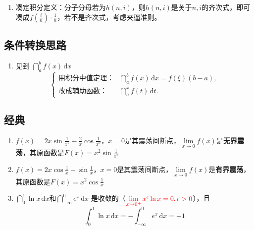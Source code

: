 \documentclass[../book.tex]{subfiles}
\begin{document}
    \begin{enumerate}
        \item 凑定积分定义：分子分母若为$h(n, i)$，则$h(n, i)$是关于$n, i$的齐次式，即可凑成$f(\displaystyle\frac{i}{n})\cdot \displaystyle\frac{1}{n}$，若不是齐次式，考虑夹逼准则。
    \end{enumerate}

    \subsection{条件转换思路}

    \begin{enumerate}
        \item 见到 $\dint_a^b f(x)\,\mathrm{d}x$
        \[
            \begin{cases}
                \text{用积分中值定理：}
                & \dint_a^b f(x)\,\mathrm{d}x = f(\xi)(b-a), \\[6pt]
                \text{改成辅助函数：}
                & \dint_a^x f(t)\,\mathrm{d}t.
            \end{cases}
        \]
    \end{enumerate}

    \subsection{经典}

    \begin{enumerate}
        \item $f(x) = 2x\sin \displaystyle\frac{1}{x^2} - \displaystyle\frac{2}{x}\cos \displaystyle\frac{1}{x^2}$，$x = 0$是其震荡间断点，$\lim\limits_{x\to 0} f(x)$是\textbf{无界震荡}，其原函数是$F(x) = x^2 \sin \displaystyle\frac{1}{x^2}$
        \item $f(x) = 2x\cos \displaystyle\frac{1}{x} + \sin \displaystyle\frac{1}{x}$，$x = 0$是其震荡间断点，$\lim\limits_{x\to 0} f(x)$是\textbf{有界震荡}，其原函数是$F(x) = x^2\cos \displaystyle\frac{1}{x}$
        \item $\dint_0^1 \ln x\,\mathrm{d}x$和$\dint_{-\infty}^0 e^x\,\mathrm{d}x$ 是收敛的（$\color{red}{\lim\limits_{x\to 0^+} x^{\epsilon}\ln x = 0, \epsilon > 0}$），且
        \[
            \int_0^1 \ln x\,\mathrm{d}x = -\int_{-\infty}^0 e^x\,\mathrm{d}x = -1
        \]
    \end{enumerate}
\end{document}
